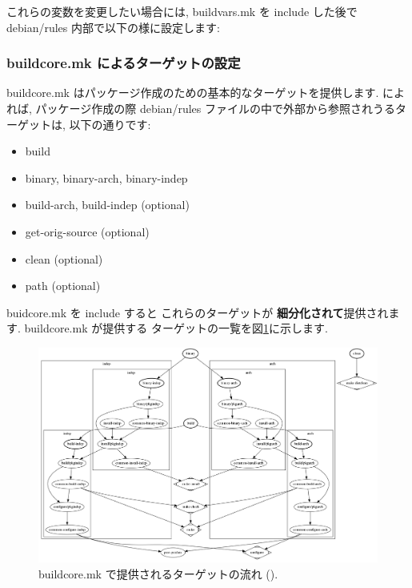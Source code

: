 \documentclass[mingoth,a4paper]{jsarticle}
\begin{document}
これらの変数を変更したい場合には, buildvars.mk を include した後で
debian/rules 内部で以下の様に設定します:

\subsubsection{buildcore.mk によるターゲットの設定}

buildcore.mk はパッケージ作成のための基本的なターゲットを提供します.
\cite{ポリシー}によれば, パッケージ作成の際
debian/rules ファイルの中で外部から参照されうるターゲットは,
以下の通りです:
\begin{itemize}
    \item build
    \item binary, binary-arch, binary-indep
    \item build-arch, build-indep (optional)
    \item get-orig-source (optional)
    \item clean (optional)
    \item path (optional)
\end{itemize}
buidcore.mk を include すると 
これらのターゲットが {\bf 細分化されて}提供されます.
buildcore.mk が提供する
ターゲットの一覧を図\ref{fig:cdbs-target}に示します.
%
\begin{figure}[htbp!]
 \begin{center}
  \includegraphics[width=160mm]{image200810/cdbs-target.png}
 \end{center}
    \caption{%
    buildcore.mk で提供されるターゲットの流れ
    (\cite{lenny CDBS doc}).
    }
    \label{fig:cdbs-target}
\end{figure}
\end{document}
